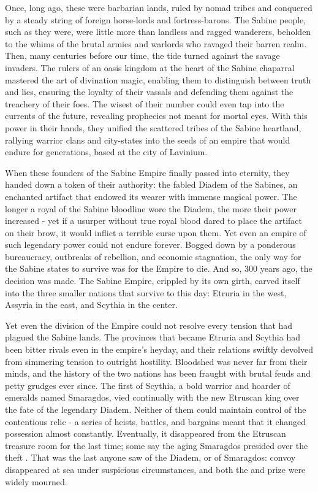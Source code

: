 \documentclass[blue]{Kos}
\begin{document}
\name{\bGeneralHistory{}}

Once, long ago, these were barbarian lands, ruled by nomad tribes and conquered by a steady string of foreign horse-lords and fortress-barons. The Sabine people, such as they were, were little more than landless and ragged wanderers, beholden to the whims of the brutal armies and warlords who ravaged their barren realm. Then, many centuries before our time, the tide turned against the savage invaders. The rulers of an oasis kingdom at the heart of the Sabine chaparral mastered the art of divination magic, enabling them to distinguish between truth and lies, ensuring the loyalty of their vassals and defending them against the treachery of their foes. The wisest of their number could even tap into the currents of the future, revealing prophecies not meant for mortal eyes. With this power in their hands, they unified the scattered tribes of the Sabine heartland, rallying warrior clans and city-states into the seeds of an empire that would endure for generations, based at the city of Lavinium. 

When these founders of the Sabine Empire finally passed into eternity, they handed down a token of their authority: the fabled Diadem of the Sabines, an enchanted artifact that endowed its wearer with immense magical power. The longer a royal of the Sabine bloodline wore the Diadem, the more their power increased - yet if a usurper without true royal blood dared to place the artifact on their brow, it would inflict a terrible curse upon them. Yet even an empire of such legendary power could not endure forever. Bogged down by a ponderous bureaucracy, outbreaks of rebellion, and economic stagnation, the only way for the Sabine states to survive was for the Empire to die. And so, 300 years ago, the decision was made. The Sabine Empire, crippled by its own girth, carved itself into the three smaller nations that survive to this day: Etruria in the west, Assyria in the east, and Scythia in the center.

Yet even the division of the Empire could not resolve every tension that had plagued the Sabine lands. The provinces that became Etruria and Scythia had been bitter rivals even in the empire's heyday, and their relations swiftly devolved from simmering tension to outright hostility. Bloodshed was never far from their minds, and the history of the two nations has been fraught with brutal feuds and petty grudges ever since. The first \cEmeraldQueen{\monarch} of Scythia, a bold warrior and hoarder of emeralds named Smaragdos, vied continually with the new Etruscan king over the fate of the legendary Diadem. Neither of them could maintain control of the contentious relic - a series of heists, battles, and bargains meant that it changed possession almost constantly. Eventually, it disappeared from the Etruscan treasure room for the last time; some say the aging Smaragdos presided over the theft \cEmeraldQueen{\themself}. That was the last anyone saw of the Diadem, or of Smaragdos: \cEmeraldQueen{\their} convoy disappeared at sea under suspicious circumstances, and both the \cEmeraldQueen{\monarch} and \cEmeraldQueen{\their} prize were widely mourned. 
\end{document}
